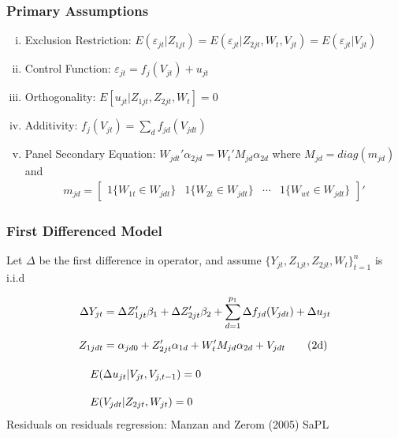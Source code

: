 \documentclass[9pt]{beamer}
\begin{document}
\begin{frame} 
\frametitle{Primary Assumptions} 

	\begin{enumerate}[i.)] \addtolength{\itemsep}{\baselineskip}
	    \item Exclusion Restriction: $E( \varepsilon_{jt}|Z_{1jt}  ) = E( \varepsilon_{jt} | Z_{2jt},W_{t},V_{jt}) = E(\varepsilon_{jt} | V_{jt})$
	    \item Control Function: $\varepsilon_{jt} = f_j(V_{jt}) + u_{jt} $	    \item Orthogonality: $E[u_{jt} |Z_{1jt},Z_{2jt},W_t] = 0$ 
	    \item Additivity: $ f_j(V_{jt}) = \sum_{d} f_{jd}(V_{jdt})$ 
	    \item Panel Secondary Equation: $W_{jdt}'\alpha_{2jd} = W_t'M_{jd}\alpha_{2d}$ where $M_{jd}=diag(m_{jd})$ and
	    \begin{align*} 
	    m_{jd} = \begin{bmatrix} 1\{W_{1t} \in W_{jdt}\} & 1\{W_{2t} \in W_{jdt}\} & \cdots & 1\{W_{wt} \in W_{jdt}\}  \end{bmatrix}'
	    \end{align*}

	\end{enumerate}
\vspace{0.25cm}	

\end{frame}
\begin{frame} 
\frametitle{First Differenced Model} 

Let $\Delta$ be the first difference in operator, and assume $\{Y_{jt},Z_{1jt},Z_{2jt},W_{t}\}_{t=1}^n$ is i.i.d 

\begin{align} 
\Delta Y_{jt} &= \Delta Z_{1jt}'\beta_1 + \Delta Z_{2jt}'\beta_2 + \sum_{d=1}^{p_1} \Delta f_{jd}(V_{jdt})  + \Delta u_{jt} \\[5pt]
%
Z_{1jdt} &= \alpha_{jd0} + Z_{2jt}' \alpha_{1d} + W_{t}'M_{jd} \alpha_{2d} + V_{jdt} \tag{2d} \\[10pt]
%
\addtocounter {equation} {1}
E(&\Delta u_{jt}|V_{jt},V_{j,t-1} ) =  0  \\[10pt]
%
E(& V_{jdt} | Z_{2jt},W_{jt}) = 0 
%
\end{align}
\vspace{0.5cm}
Residuals on residuals regression: Manzan and Zerom (2005) SaPL

\end{frame}
\end{document}
